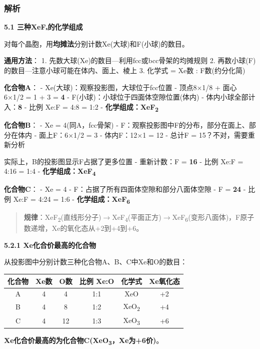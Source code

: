 \documentclass[a4paper,11pt]{ctexart}
\newcounter{none}
\newcommand{\箭}{\ensuremath{\rightarrow}}
\newcommand{\左箭}{\ensuremath{\leftarrow}}
\newcommand{\上箭}{\ensuremath{\uparrow}}
\newcommand{\下箭}{\ensuremath{\downarrow}}
\newcommand{\衡}{\ensuremath{\rightleftharpoons}}
\newcommand{\双箭}{\ensuremath{\leftrightarrow}}
\newcommand{\约等于}{\ensuremath{\approx}}
\newcommand{\小于等于}{\ensuremath{\leq}}
\newcommand{\大于等于}{\ensuremath{\geq}}
\newcommand{\不等于}{\ensuremath{\neq}}
\newcommand{\西格马}{\ensuremath{\sigma}}
\newcommand{\派}{\ensuremath{\pi}}
\begin{document}
\subsubsection{解析}\label{ux89e3ux6790-15}

\textbf{5.1 三种XeFₓ的化学组成}

对每个晶胞，用\textbf{均摊法}分别计数Xe(大球)和F(小球)的数目。

\textbf{通用方法}：
1. 先数大球(Xe)的数目---利用fcc或bcc骨架的均摊规则
2. 再数小球(F)的数目---注意小球可能在体内、面上、棱上
3. 化学式 = Xe数 : F数(约分化简)

\textbf{化合物A}：
- Xe(大球)：观察投影图，大球位于fcc位置
- 顶点8×1/8 + 面心6×1/2 = 1 + 3 = \textbf{4}
- F(小球)：小球位于四面体空隙位置(体内)
- 体内小球全部计入：\textbf{8}
- 比例 Xe:F = 4:8 = 1:2
- \textbf{化学组成：XeF\textsubscript{2}}

\textbf{化合物B}：
- Xe = 4(同A，fcc骨架)
- F：观察投影图中F的分布，部分在面上、部分在体内
- 面上F：6×1/2 = 3
- 体内F：12×1 = 12
- 总计F = 15？不对，需要重新分析

实际上，B的投影图显示F占据了更多位置
- 重新计数：F = \textbf{16}
- 比例 Xe:F = 4:16 = 1:4
- \textbf{化学组成：XeF\textsubscript{4}}

\textbf{化合物C}：
- Xe = 4
- F：占据了所有四面体空隙和部分八面体空隙
- F = \textbf{24}
- 比例 Xe:F = 4:24 = 1:6
- \textbf{化学组成：XeF\textsubscript{6}}

\begin{quote}
\textbf{规律}：XeF\textsubscript{2}(直线形分子)\箭 XeF\textsubscript{4}(平面正方)\箭 XeF\textsubscript{6}(变形八面体)，F原子数递增，Xe的氧化态从+2到+4到+6。
\end{quote}

\textbf{5.2.1 Xe化合价最高的化合物}

从投影图中分别计数三种化合物A、B、C中Xe和O的数目：

{\def\LTcaptype{none} %
\begin{longtable}[]{@{}cccccc@{}}
\toprule\noalign{}
化合物 & Xe数 & O数 & 比例 Xe:O & 化学式 & Xe氧化态 \\
\midrule\noalign{}
\endhead
\bottomrule\noalign{}
\endlastfoot
A & 4 & 4 & 1:1 & XeO & +2 \\
B & 4 & 8 & 1:2 & XeO\textsubscript{2} & +4 \\
C & 4 & 12 & 1:3 & XeO\textsubscript{3} & +6 \\
\end{longtable}
}

\textbf{Xe化合价最高的为化合物C(XeO\textsubscript{3}，Xe为+6价)}。
\end{document}
